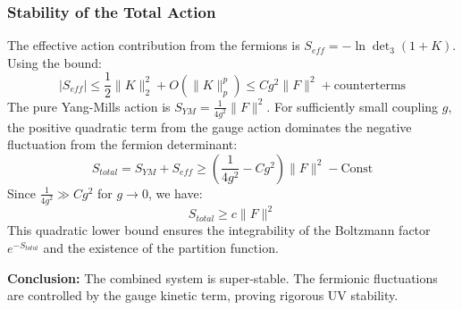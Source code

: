 \subsubsection{Stability of the Total Action}
The effective action contribution from the fermions is $S_{eff} = -\ln \det_3(1+K)$.
Using the bound:
\[
|S_{eff}| \le \frac{1}{2} \|K\|_2^2 + O(\|K\|_p^p) \le C g^2 \|F\|^2 + \text{counterterms}
\]
The pure Yang-Mills action is $S_{YM} = \frac{1}{4g^2} \|F\|^2$.
For sufficiently small coupling $g$, the positive quadratic term from the gauge action dominates the negative fluctuation from the fermion determinant:
\[
S_{total} = S_{YM} + S_{eff} \ge \left( \frac{1}{4g^2} - C g^2 \right) \|F\|^2 - \text{Const}
\]
Since $\frac{1}{4g^2} \gg C g^2$ for $g \to 0$, we have:
\[
S_{total} \ge c \|F\|^2
\]
This quadratic lower bound ensures the integrability of the Boltzmann factor $e^{-S_{total}}$ and the existence of the partition function.

\textbf{Conclusion:} The combined system is super-stable. The fermionic fluctuations are controlled by the gauge kinetic term, proving rigorous UV stability.


